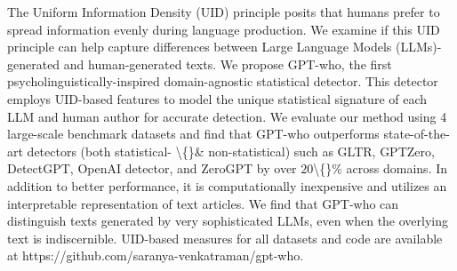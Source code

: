 The Uniform Information Density (UID) principle posits that humans prefer to spread information evenly during language production. We examine if this UID principle can help capture differences between Large Language Models (LLMs)-generated and human-generated texts. We propose GPT-who, the first psycholinguistically-inspired domain-agnostic statistical detector. This detector employs UID-based features to model the unique statistical signature of each LLM and human author for accurate detection.  We evaluate our method using 4 large-scale benchmark datasets and find that GPT-who outperforms state-of-the-art detectors (both statistical- \textbackslash\{\}\& non-statistical) such as GLTR, GPTZero, DetectGPT, OpenAI detector, and ZeroGPT by over $20$\textbackslash\{\}\% across domains. In addition to better performance,  it is computationally inexpensive and utilizes an interpretable representation of text articles. We find that GPT-who can distinguish texts generated by very sophisticated LLMs, even when the overlying text is indiscernible. UID-based measures for all datasets and code are available at https://github.com/saranya-venkatraman/gpt-who.